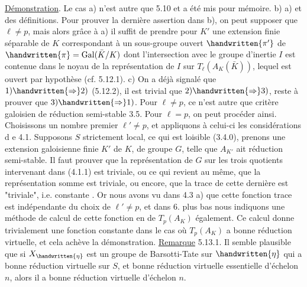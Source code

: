 \uline{Démonstration}. Le cas a) n'est autre que 5.10 et a été mis pour mémoire.
b)   a) et des définitions. Pour prouver la dernière assertion dans b), on peut  supposer que $\ell\neq p$, mais alors grâce à a) il suffit de prendre pour $K'$ une extension finie séparable de $K$ correspondant à un sous-groupe ouvert $\handwritten{\pi'}$ de $\handwritten{\pi}=\mathrm{Gal}(\bar K/K)$ dont l'intersection avec le groupe d'inertie $I$ est contenue dans le  noyau de la représentation de $I$ sur $T_{\ell}(A_K(\bar K))$, lequel est  ouvert par hypothèse (cf. 5.12.1).
c) On a déjà signalé que $1)\handwritten{\Rightarrow}2)$ (5.12.2), il est trivial que $2)\handwritten{\Rightarrow}3)$, reste à prouver que $3)\handwritten{\Rightarrow}1)$. Pour $\ell\neq p$, ce n'est autre que  critère galoisien de réduction semi-stable 3.5. Pour $\ell=p$, on peut procéder ainsi. Choisissons un nombre premier $\ell'\neq p$, et appliquons à celui-ci les considérations d e 4.1. 
Supposons $S$ strictement local, ce qui est loisible (3.4.0), prenons une extension galoisienne finie $K'$ de $K$, de groupe $G$, telle que $A_{K'}$ ait réduction semi-stable. Il faut prouver que la représentation de $G$ sur les trois quotients intervenant dans (4.1.1) est triviale, ou ce qui revient au même, que la  représentation somme est triviale, ou encore, que la trace de cette dernière est "triviale", i.e. constante . Or nous avons vu dans 4.3 a) que cette fonction trace est indépendante du choix de $\ell'\neq p$, et dans 6. plus bas nous indiquons une méthode de calcul de cette fonction en  de $T_p(A_K)$ également. Ce calcul donne trivialement une fonction constante dans le cas où $T_p(A_K)$ a bonne réduction virtuelle, et cela achève la démonstration.
\uline{Remarque} 5.13.1. Il semble plausible que si $X_{\handwritten{\eta}}$ est un groupe de Barsotti-Tate sur $\handwritten{\eta}$ qui a bonne réduction virtuelle sur $S$, et bonne réduction virtuelle essentielle d'échelon $n$, alors il a bonne réduction virtuelle d'échelon $n$. 
